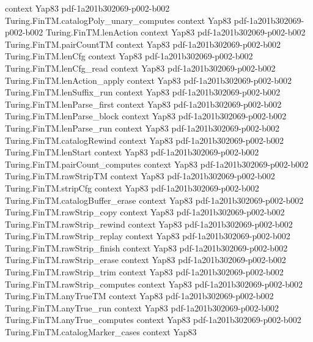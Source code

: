 \begin{theorem}
  {context}
  {Yap83}
  {pdf-1a201b302069-p002-b002}
\proofstep
  {Turing.FinTM.catalogPoly_unary_computes}
  {context}
  {Yap83}
  {pdf-1a201b302069-p002-b002}
\proofstep
  {Turing.FinTM.lenAction}
  {context}
  {Yap83}
  {pdf-1a201b302069-p002-b002}
\proofstep
  {Turing.FinTM.pairCountTM}
  {context}
  {Yap83}
  {pdf-1a201b302069-p002-b002}
\proofstep
  {Turing.FinTM.lenCfg}
  {context}
  {Yap83}
  {pdf-1a201b302069-p002-b002}
\proofstep
  {Turing.FinTM.lenCfg_read}
  {context}
  {Yap83}
  {pdf-1a201b302069-p002-b002}
\proofstep
  {Turing.FinTM.lenAction_apply}
  {context}
  {Yap83}
  {pdf-1a201b302069-p002-b002}
\proofstep
  {Turing.FinTM.lenSuffix_run}
  {context}
  {Yap83}
  {pdf-1a201b302069-p002-b002}
\proofstep
  {Turing.FinTM.lenParse_first}
  {context}
  {Yap83}
  {pdf-1a201b302069-p002-b002}
\proofstep
  {Turing.FinTM.lenParse_block}
  {context}
  {Yap83}
  {pdf-1a201b302069-p002-b002}
\proofstep
  {Turing.FinTM.lenParse_run}
  {context}
  {Yap83}
  {pdf-1a201b302069-p002-b002}
\proofstep
  {Turing.FinTM.catalogRewind}
  {context}
  {Yap83}
  {pdf-1a201b302069-p002-b002}
\proofstep
  {Turing.FinTM.lenStart}
  {context}
  {Yap83}
  {pdf-1a201b302069-p002-b002}
\proofstep
  {Turing.FinTM.pairCount_computes}
  {context}
  {Yap83}
  {pdf-1a201b302069-p002-b002}
\proofstep
  {Turing.FinTM.rawStripTM}
  {context}
  {Yap83}
  {pdf-1a201b302069-p002-b002}
\proofstep
  {Turing.FinTM.stripCfg}
  {context}
  {Yap83}
  {pdf-1a201b302069-p002-b002}
\proofstep
  {Turing.FinTM.catalogBuffer_erase}
  {context}
  {Yap83}
  {pdf-1a201b302069-p002-b002}
\proofstep
  {Turing.FinTM.rawStrip_copy}
  {context}
  {Yap83}
  {pdf-1a201b302069-p002-b002}
\proofstep
  {Turing.FinTM.rawStrip_rewind}
  {context}
  {Yap83}
  {pdf-1a201b302069-p002-b002}
\proofstep
  {Turing.FinTM.rawStrip_replay}
  {context}
  {Yap83}
  {pdf-1a201b302069-p002-b002}
\proofstep
  {Turing.FinTM.rawStrip_finish}
  {context}
  {Yap83}
  {pdf-1a201b302069-p002-b002}
\proofstep
  {Turing.FinTM.rawStrip_erase}
  {context}
  {Yap83}
  {pdf-1a201b302069-p002-b002}
\proofstep
  {Turing.FinTM.rawStrip_trim}
  {context}
  {Yap83}
  {pdf-1a201b302069-p002-b002}
\proofstep
  {Turing.FinTM.rawStrip_computes}
  {context}
  {Yap83}
  {pdf-1a201b302069-p002-b002}
\proofstep
  {Turing.FinTM.anyTrueTM}
  {context}
  {Yap83}
  {pdf-1a201b302069-p002-b002}
\proofstep
  {Turing.FinTM.anyTrue_run}
  {context}
  {Yap83}
  {pdf-1a201b302069-p002-b002}
\proofstep
  {Turing.FinTM.anyTrue_computes}
  {context}
  {Yap83}
  {pdf-1a201b302069-p002-b002}
\proofstep
  {Turing.FinTM.catalogMarker_cases}
  {context}
  {Yap83}

\end{theorem}
